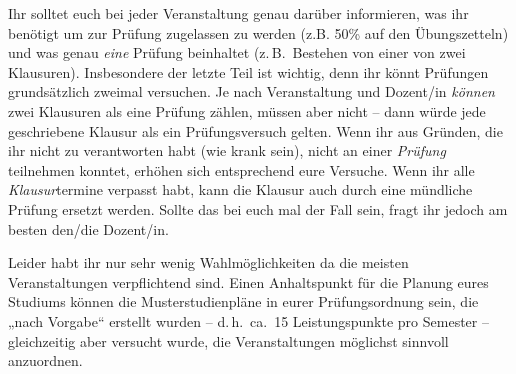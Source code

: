 Ihr solltet euch bei jeder Veranstaltung genau darüber informieren,
was ihr benötigt um zur Prüfung zugelassen zu werden (z.B. 50\% auf
den Übungszetteln) und was genau \emph{eine} Prüfung beinhaltet
(z.\,B.\ Bestehen von einer von zwei Klausuren). Insbesondere der
letzte Teil ist wichtig, denn ihr könnt Prüfungen grundsätzlich
zweimal versuchen. Je nach Veranstaltung und Dozent/in \emph{können}
zwei Klausuren als eine Prüfung zählen, müssen aber nicht -- dann
würde jede geschriebene Klausur als ein Prüfungsversuch gelten. Wenn
ihr aus Gründen, die ihr nicht zu verantworten habt (wie krank sein),
nicht an einer \emph{Prüfung} teilnehmen konntet, erhöhen sich
entsprechend eure Versuche. Wenn ihr alle \emph{Klausur}termine
verpasst habt, kann die Klausur auch durch eine mündliche Prüfung
ersetzt werden. Sollte das bei euch mal der Fall sein, fragt ihr
jedoch am besten den/die Dozent/in.

Leider habt ihr nur sehr wenig Wahlmöglichkeiten da die meisten Veranstaltungen verpflichtend sind.
Einen Anhaltspunkt für die Planung eures Studiums können die Musterstudienpläne in eurer
Prüfungsordnung sein, die „nach Vorgabe“ erstellt wurden -- d.\,h.\
ca.\ 15 Leistungspunkte pro Semester -- gleichzeitig aber versucht
wurde, die Veranstaltungen möglichst sinnvoll anzuordnen.
